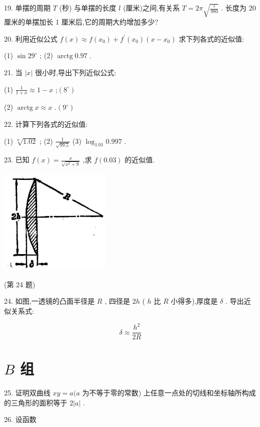 \documentclass[lang=cn,newtx,10pt,scheme=chinese]{elegantbook}
\begin{document}
19. 单摆的周期 \(T\) (秒) 与单摆的长度 \(l\) (厘米)之间,有关系 \(T = {2\pi }\sqrt{\frac{l}{980}}\) . 长度为 20 厘米的单摆加长 1 厘米后,它的周期大约增加多少?

20. 利用近似公式 \(f\left( x\right) \approx f\left( {x}_{0}\right) + {f}^{\prime }\left( {x}_{0}\right) \left( {x - {x}_{0}}\right)\) 求下列各式的近似值:

(1) \(\sin {29}^{ \circ }\) ; (2) \(\operatorname{arctg}{0.97}\) .

21. 当 \(\left| x\right|\) 很小时,导出下列近似公式:

(1) \(\frac{1}{1 + x} \approx 1 - x\) ;\(\left( {8}^{ \circ }\right)\)

(2) \(\operatorname{arctg}x \approx x\) .\(\left( {9}^{ \circ }\right)\)

22. 计算下列各式的近似值:

(1) \(\sqrt[8]{1.02}\) ; (2) \(\frac{1}{\sqrt{99.5}}\) (3) \({\log }_{1.01}{0.997}\) .

23. 已知 \(f\left( x\right) = \frac{x}{\sqrt{{x}^{2} + 9}}\) ,求 \(f\left( {0.03}\right)\) 的近似值.

\begin{center}
\includegraphics[max width=0.4\textwidth]{images/01912c18-5c3f-733d-b775-749ba9897a9d_128_440234.jpg}
\end{center}

(第 24 题)

24. 如图,一透镜的凸面半径是 \(R\) , 四径是 \({2h}\) ( \(h\) 比 \(R\) 小得多),厚度是 \(\delta\) . 导出近似关系式:

\[
\delta \approx \frac{{h}^{2}}{2R}
\]

\section*{\(B\) 组}

25. 证明双曲线 \({xy} = a(a\) 为不等于零的常数) 上任意一点处的切线和坐标轴所构成的三角形的面积等于 \(2\left| a\right|\) .

26. 设函数
\end{document}
